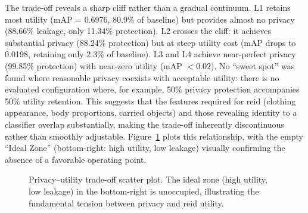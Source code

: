 The trade-off reveals a sharp cliff rather than a gradual continuum. L1 retains most utility (mAP = 0.6976, 80.9\% of baseline) but provides almost no privacy (88.66\% leakage, only 11.34\% protection). L2 crosses the cliff: it achieves substantial privacy (88.24\% protection) but at steep utility cost (mAP drops to 0.0198, retaining only 2.3\% of baseline). L3 and L4 achieve near-perfect privacy (99.85\% protection) with near-zero utility (mAP $< 0.02$). No ``sweet spot'' was found where reasonable privacy coexists with acceptable utility: there is no evaluated configuration where, for example, 50\% privacy protection accompanies 50\% utility retention. This suggests that the features required for \acrshort{reid} (clothing appearance, body proportions, carried objects) and those revealing identity to a classifier overlap substantially, making the trade-off inherently discontinuous rather than smoothly adjustable. Figure~\ref{fig:tradeoff_scatter} plots this relationship, with the empty ``Ideal Zone'' (bottom-right: high utility, low leakage) visually confirming the absence of a favorable operating point.

\begin{figure}[H]
    \centering
    \caption{Privacy--utility trade-off scatter plot. The ideal zone (high utility, low leakage) in the bottom-right is unoccupied, illustrating the fundamental tension between privacy and \acrshort{reid} utility.}
    \label{fig:tradeoff_scatter}
\end{figure}


